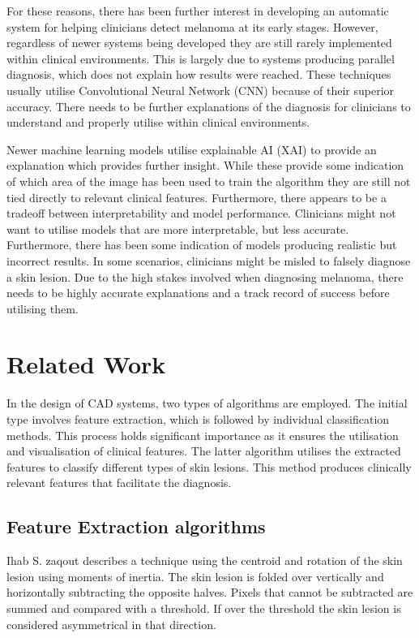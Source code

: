 For these reasons, there has been further interest in developing an automatic system for helping clinicians detect melanoma at its early stages. However, regardless of newer systems being developed they are still rarely implemented within clinical environments. This is largely due to systems producing parallel diagnosis, which does not explain how results were reached\cite{Lipton2018, Andre2017}. These techniques usually utilise Convolutional Neural Network (CNN) because of their superior accuracy\cite{Wen2022}. There needs to be further explanations of the diagnosis for clinicians to understand and properly utilise within clinical environments. 

Newer machine learning models utilise explainable AI (XAI) to provide an explanation which provides further insight\cite{skar2017}. While these provide some indication of which area of the image has been used to train the algorithm they are still not tied directly to relevant clinical features. Furthermore, there appears to be a tradeoff between interpretability and model performance. Clinicians might not want to utilise models that are more interpretable, but less accurate. Furthermore, there has been some indication of models producing realistic but incorrect results\cite{Lipton2018}. In some scenarios, clinicians might be misled to falsely diagnose a skin lesion. Due to the high stakes involved when diagnosing melanoma, there needs to be highly accurate explanations and a track record of success before utilising them.

\section{Related Work}
In the design of CAD systems, two types of algorithms are employed. The initial type involves feature extraction, which is followed by individual classification methods. This process holds significant importance as it ensures the utilisation and visualisation of clinical features. The latter algorithm utilises the extracted features to classify different types of skin lesions. This method produces clinically relevant features that facilitate the diagnosis.

\subsection{Feature Extraction algorithms}
Ihab S. zaqout\cite{Zaqout2016} describes a technique using the centroid and rotation of the skin lesion using moments of inertia. The skin lesion is folded over vertically and horizontally subtracting the opposite halves. Pixels that cannot be subtracted are summed and compared with a threshold. If over the threshold the skin lesion is considered asymmetrical in that direction.

